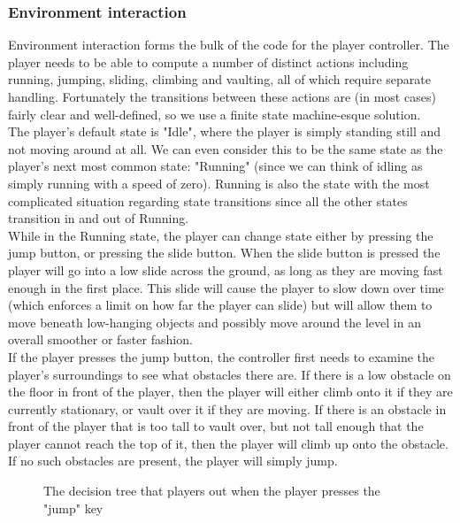 \documentclass[11pt,a4paper]{article}
\begin{document}
\subsubsection{Environment interaction}
Environment interaction forms the bulk of the code for the player controller. The player needs to be able to compute a number of distinct actions including running, jumping, sliding, climbing and vaulting, all of which require separate handling. Fortunately the transitions between these actions are (in most cases) fairly clear and well-defined, so we use a finite state machine-esque solution. \\
The player's default state is "Idle", where the player is simply standing still and not moving around at all. We can even consider this to be the same state as the player's next most common state: "Running" (since we can think of idling as simply running with a speed of zero). Running is also the state with the most complicated situation regarding state transitions since all the other states transition in and out of Running. \\
While in the Running state, the player can change state either by pressing the jump button, or pressing the slide button. When the slide button is pressed the player will go into a low slide across the ground, as long as they are moving fast enough in the first place. This slide will cause the player to slow down over time (which enforces a limit on how far the player can slide) but will allow them to move beneath low-hanging objects and possibly move around the level in an overall smoother or faster fashion. \\
If the player presses the jump button, the controller first needs to examine the player's surroundings to see what obstacles there are. If there is a low obstacle on the floor in front of the player, then the player will either climb onto it if they are currently stationary, or vault over it if they are moving. If there is an obstacle in front of the player that is too tall to vault over, but not tall enough that the player cannot reach the top of it, then the player will climb up onto the obstacle. If no such obstacles are present, the player will simply jump.
\begin{figure}[H]
    \caption{The decision tree that players out when the player presses the "jump" key}
    \label{fig:jumpDecisionTree}
\end{figure}
\end{document}
